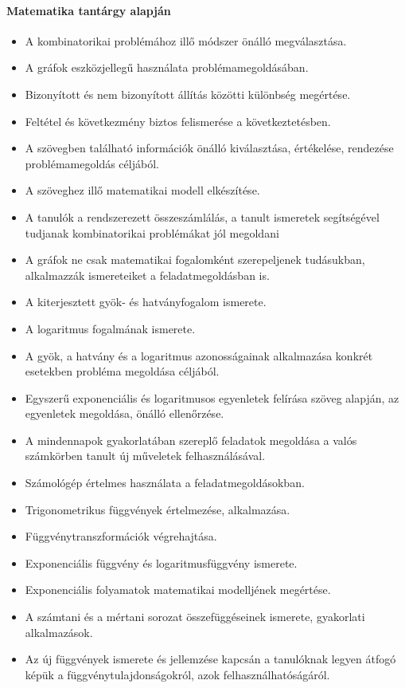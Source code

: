 \paragraph{Matematika tantárgy alapján}
\begin{itemize}
\item A kombinatorikai problémához illő módszer önálló megválasztása.
\item A gráfok eszközjellegű használata problémamegoldásában.
\item Bizonyított és nem bizonyított állítás közötti különbség megértése.
\item Feltétel és következmény biztos felismerése a következtetésben.
\item A szövegben található információk önálló kiválasztása, értékelése, rendezése problémamegoldás céljából.
\item A szöveghez illő matematikai modell elkészítése.
\item A tanulók a rendszerezett összeszámlálás, a tanult ismeretek segítségével tudjanak kombinatorikai problémákat jól megoldani
\item A gráfok ne csak matematikai fogalomként szerepeljenek tudásukban, alkalmazzák ismereteiket a feladatmegoldásban is.
\item A kiterjesztett gyök- és hatványfogalom ismerete.
\item A logaritmus fogalmának ismerete.
\item A gyök, a hatvány és a logaritmus azonosságainak alkalmazása konkrét esetekben probléma megoldása céljából.
\item Egyszerű exponenciális és logaritmusos egyenletek felírása szöveg alapján, az egyenletek megoldása, önálló ellenőrzése.
\item A mindennapok gyakorlatában szereplő feladatok megoldása a valós számkörben tanult új műveletek felhasználásával.
\item Számológép értelmes használata a feladatmegoldásokban.
\item Trigonometrikus függvények értelmezése, alkalmazása.
\item Függvénytranszformációk végrehajtása.
\item Exponenciális függvény és logaritmusfüggvény ismerete.
\item Exponenciális folyamatok matematikai modelljének megértése.
\item A számtani és a mértani sorozat összefüggéseinek ismerete, gyakorlati alkalmazások.
\item Az új függvények ismerete és jellemzése kapcsán a tanulóknak legyen átfogó képük a függvénytulajdonságokról, azok felhasználhatóságáról.

\end{itemize}
